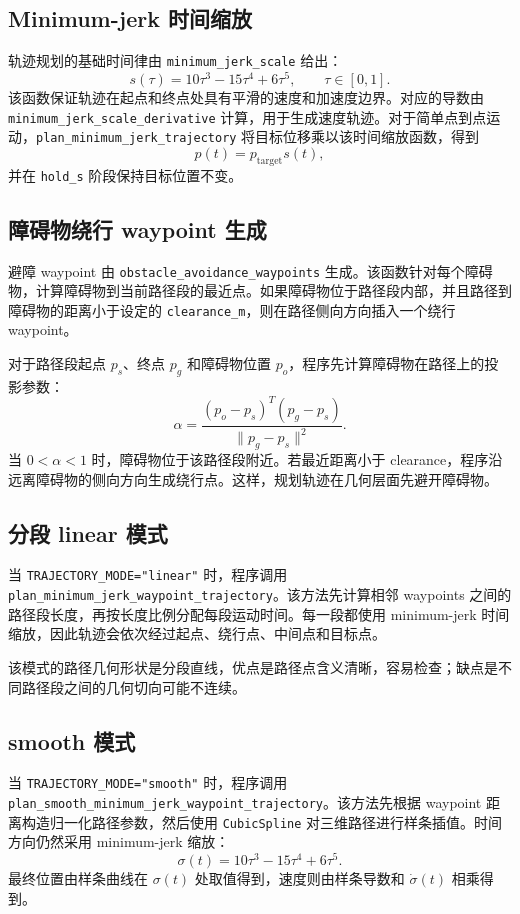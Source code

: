 \documentclass[11pt]{article}
\begin{document}
\subsection{Minimum-jerk 时间缩放}

轨迹规划的基础时间律由 \texttt{minimum\_jerk\_scale} 给出：
\[
s(\tau)=10\tau^3-15\tau^4+6\tau^5,\qquad \tau\in[0,1].
\]
该函数保证轨迹在起点和终点处具有平滑的速度和加速度边界。对应的导数由 \texttt{minimum\_jerk\_scale\_derivative} 计算，用于生成速度轨迹。对于简单点到点运动，\texttt{plan\_minimum\_jerk\_trajectory} 将目标位移乘以该时间缩放函数，得到
\[
p(t)=p_{\mathrm{target}}s(t),
\]
并在 \texttt{hold\_s} 阶段保持目标位置不变。

\subsection{障碍物绕行 waypoint 生成}

避障 waypoint 由 \texttt{obstacle\_avoidance\_waypoints} 生成。该函数针对每个障碍物，计算障碍物到当前路径段的最近点。如果障碍物位于路径段内部，并且路径到障碍物的距离小于设定的 \texttt{clearance\_m}，则在路径侧向方向插入一个绕行 waypoint。

对于路径段起点 \(p_s\)、终点 \(p_g\) 和障碍物位置 \(p_o\)，程序先计算障碍物在路径上的投影参数：
\[
\alpha=\frac{(p_o-p_s)^T(p_g-p_s)}{\|p_g-p_s\|^2}.
\]
当 \(0<\alpha<1\) 时，障碍物位于该路径段附近。若最近距离小于 clearance，程序沿远离障碍物的侧向方向生成绕行点。这样，规划轨迹在几何层面先避开障碍物。

\subsection{分段 linear 模式}

当 \texttt{TRAJECTORY\_MODE="linear"} 时，程序调用 \texttt{plan\_minimum\_jerk\_waypoint\_trajectory}。该方法先计算相邻 waypoints 之间的路径段长度，再按长度比例分配每段运动时间。每一段都使用 minimum-jerk 时间缩放，因此轨迹会依次经过起点、绕行点、中间点和目标点。

该模式的路径几何形状是分段直线，优点是路径点含义清晰，容易检查；缺点是不同路径段之间的几何切向可能不连续。

\subsection{smooth 模式}

当 \texttt{TRAJECTORY\_MODE="smooth"} 时，程序调用 \texttt{plan\_smooth\_minimum\_jerk\_waypoint\_trajectory}。该方法先根据 waypoint 距离构造归一化路径参数，然后使用 \texttt{CubicSpline} 对三维路径进行样条插值。时间方向仍然采用 minimum-jerk 缩放：
\[
\sigma(t)=10\tau^3-15\tau^4+6\tau^5.
\]
最终位置由样条曲线在 \(\sigma(t)\) 处取值得到，速度则由样条导数和 \(\dot{\sigma}(t)\) 相乘得到。
\end{document}
